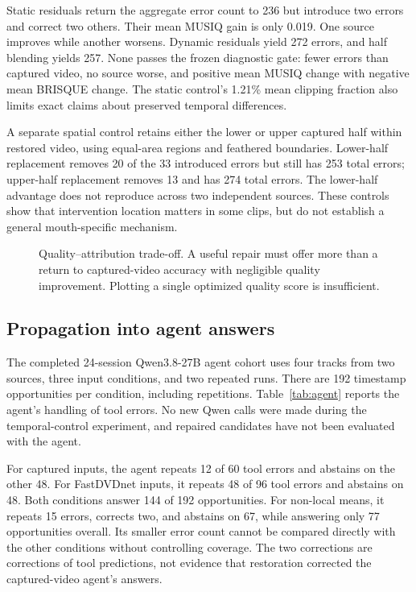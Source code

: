 Static residuals return the aggregate error count to 236 but introduce two errors and correct two others. Their mean MUSIQ gain is only 0.019. One source improves while another worsens. Dynamic residuals yield 272 errors, and half blending yields 257. None passes the frozen diagnostic gate: fewer errors than captured video, no source worse, and positive mean MUSIQ change with negative mean BRISQUE change. The static control's 1.21\% mean clipping fraction also limits exact claims about preserved temporal differences.

A separate spatial control retains either the lower or upper captured half within restored video, using equal-area regions and feathered boundaries. Lower-half replacement removes 20 of the 33 introduced errors but still has 253 total errors; upper-half replacement removes 13 and has 274 total errors. The lower-half advantage does not reproduce across two independent sources. These controls show that intervention location matters in some clips, but do not establish a general mouth-specific mechanism.

\begin{figure}[t]
\centering
{}
\caption{Quality--attribution trade-off. A useful repair must offer more than a return to captured-video accuracy with negligible quality improvement. Plotting a single optimized quality score is insufficient.}
\end{figure}

\subsection{Propagation into agent answers}
The completed 24-session Qwen3.8-27B agent cohort uses four tracks from two sources, three input conditions, and two repeated runs. There are 192 timestamp opportunities per condition, including repetitions. Table~\ref{tab:agent} reports the agent's handling of tool errors. No new Qwen calls were made during the temporal-control experiment, and repaired candidates have not been evaluated with the agent.

For captured inputs, the agent repeats 12 of 60 tool errors and abstains on the other 48. For FastDVDnet inputs, it repeats 48 of 96 tool errors and abstains on 48. Both conditions answer 144 of 192 opportunities. For non-local means, it repeats 15 errors, corrects two, and abstains on 67, while answering only 77 opportunities overall. Its smaller error count cannot be compared directly with the other conditions without controlling coverage. The two corrections are corrections of tool predictions, not evidence that restoration corrected the captured-video agent's answers.

